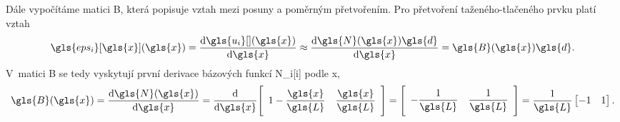 Dále vypočítáme matici \gls{B}, která popisuje vztah mezi posuny a poměrným přetvořením. Pro přetvoření taženého-tlačeného prvku platí vztah
\begin{equation}
    \gls{eps_i}[\gls{x}](\gls{x}) = \dv{\gls{u_i}[ ](\gls{x})}{\gls{x}} \approx \dv{\gls{N}(\gls{x}) \gls{d}}{\gls{x}} = \gls{B}(\gls{x})\gls{d}.
\end{equation}
V~matici \gls{B} se tedy vyskytují první derivace bázových funkcí \gls{N_i}[i] podle \gls{x},
\begin{equation} \label{eq:bar_B}
    \gls{B}(\gls{x}) = \dv{\gls{N}(\gls{x})}{\gls{x}}
    =
    \dv{\gls{x}} 
    \Bigg[
        \begin{array}{cc}
            1 - \dfrac{\gls{x}}{\gls{L}} & \dfrac{\gls{x}}{\gls{L}}
        \end{array}
    \Bigg]
    =
    \Bigg[
        \begin{array}{cc}
            -\dfrac{1}{\gls{L}} & \dfrac{1}{\gls{L}}
        \end{array}
    \Bigg]
    =
    \frac{1}{\gls{L}}
    \begin{bmatrix}
        -1 & 1
    \end{bmatrix}.
\end{equation}

